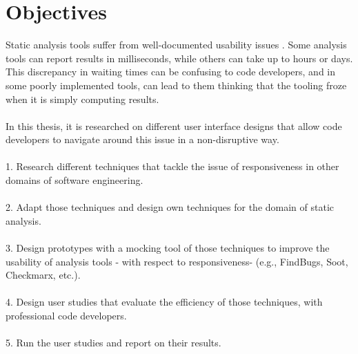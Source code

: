 \chapter{Objectives}
\label{ch:objectives}

Static analysis tools suffer from well-documented usability issues \cite{CB16,JSMB13}. Some analysis tools can report results in milliseconds, while others can take up to hours or
days. This discrepancy in waiting times can be confusing to code developers, and in some poorly implemented
tools, can lead to them thinking that the tooling froze when it is simply computing results. \\ \\
In this thesis, it is researched on different user interface designs that allow code developers to navigate around
this issue in a non-disruptive way. \\ \\
1. Research different techniques that tackle the issue of responsiveness in other domains of software
engineering. \\ \\
2. Adapt those techniques and design own techniques for the domain of static analysis. \\ \\
3. Design prototypes with a mocking tool \cite{B} of those techniques to improve the usability of analysis tools -
with respect to responsiveness- (e.g., FindBugs, Soot, Checkmarx, etc.). \\ \\
4. Design user studies that evaluate the efficiency of those techniques, with professional code developers. \\ \\
5. Run the user studies and report on their results.